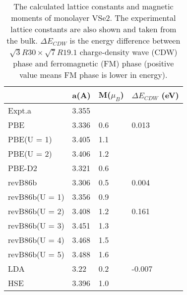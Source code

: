 \documentclass[reprint, aps, prb, showkeys]{revtex4-2}
\begin{document}
\begin{table}[]
    \caption{\label{table:Kezilebieke2020_FunctionTest} The calculated lattice constants and magnetic moments of monolayer VSe2. The experimental lattice constants are also shown and taken from the bulk. $\Delta E_{CDW}$ is the energy difference between $\sqrt{3}R30 \times \sqrt{7}R19.1$ charge-density wave (CDW) phase and ferromagnetic (FM) phase (positive value means FM phase is lower in energy).}
    \begin{ruledtabular}
    \begin{tabular}{llll}
                   & a(A)  & M($\mu_B$) & $\Delta E_{CDW}$ (eV) \\
    \hline
    Expt.a         & 3.355 &            &                       \\
    PBE            & 3.336 & 0.6        & 0.013                 \\
    PBE(U = 1)     & 3.405 & 1.1        &                       \\
    PBE(U = 2)     & 3.406 & 1.2        &                       \\
    PBE-D2         & 3.321 & 0.6        &                       \\
    revB86b        & 3.306 & 0.5        & 0.004                 \\
    revB86b(U = 1) & 3.356 & 0.9        &                       \\
    revB86b(U = 2) & 3.408 & 1.2        & 0.161                 \\
    revB86b(U = 3) & 3.451 & 1.3        &                       \\
    revB86b(U = 4) & 3.468 & 1.5        &                       \\
    revB86b(U = 5) & 3.488 & 1.6        &                       \\
    LDA            & 3.22  & 0.2        & -0.007                \\
    HSE            & 3.396 & 1.0        &                      
    \end{tabular}
    \end{ruledtabular}
\end{table}
\end{document}
